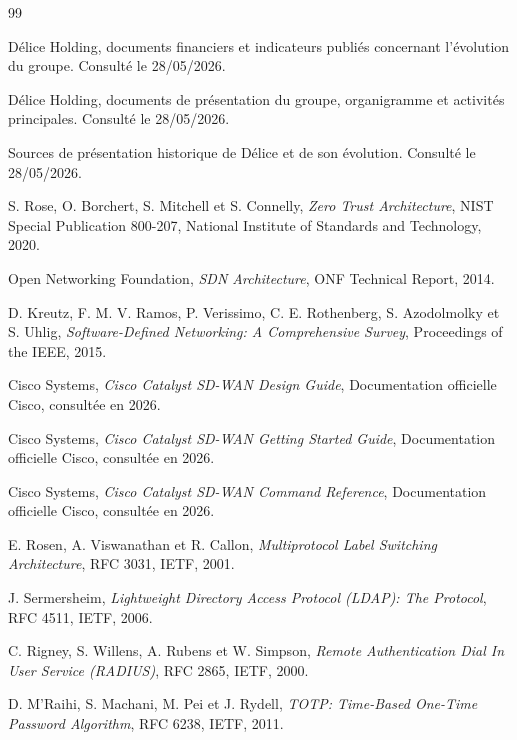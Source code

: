 \documentclass[12pt,a4paper,oneside]{report}
\begin{document}
\begin{thebibliography}{99}

Délice Holding, documents financiers et indicateurs publiés concernant l'évolution du groupe. Consulté le 28/05/2026.

Délice Holding, documents de présentation du groupe, organigramme et activités principales. Consulté le 28/05/2026.

Sources de présentation historique de Délice et de son évolution. Consulté le 28/05/2026.

	
	S. Rose, O. Borchert, S. Mitchell et S. Connelly,
	\textit{Zero Trust Architecture},
	NIST Special Publication 800-207, National Institute of Standards and Technology, 2020.
	
	Open Networking Foundation,
	\textit{SDN Architecture},
	ONF Technical Report, 2014.
	
	D. Kreutz, F. M. V. Ramos, P. Verissimo, C. E. Rothenberg, S. Azodolmolky et S. Uhlig,
	\textit{Software-Defined Networking: A Comprehensive Survey},
	Proceedings of the IEEE, 2015.
	
	Cisco Systems,
	\textit{Cisco Catalyst SD-WAN Design Guide},
	Documentation officielle Cisco, consultée en 2026.
	
	Cisco Systems,
	\textit{Cisco Catalyst SD-WAN Getting Started Guide},
	Documentation officielle Cisco, consultée en 2026.
	
	Cisco Systems,
	\textit{Cisco Catalyst SD-WAN Command Reference},
	Documentation officielle Cisco, consultée en 2026.
	
	E. Rosen, A. Viswanathan et R. Callon,
	\textit{Multiprotocol Label Switching Architecture},
	RFC 3031, IETF, 2001.
	
	J. Sermersheim,
	\textit{Lightweight Directory Access Protocol (LDAP): The Protocol},
	RFC 4511, IETF, 2006.
	
	C. Rigney, S. Willens, A. Rubens et W. Simpson,
	\textit{Remote Authentication Dial In User Service (RADIUS)},
	RFC 2865, IETF, 2000.
	
	D. M'Raihi, S. Machani, M. Pei et J. Rydell,
	\textit{TOTP: Time-Based One-Time Password Algorithm},
	RFC 6238, IETF, 2011.
	

\end{thebibliography}
\end{document}
